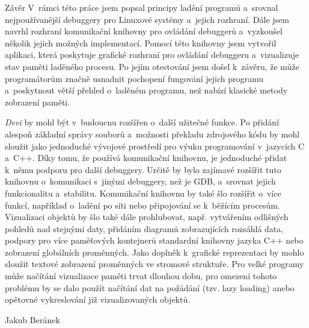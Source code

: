 \documentclass[czech,bachelor,male,python,dept460,hidelinks]{diploma}						%
\newcommand{\parspace}[1][]{
	\ifthenelse{\isempty{#1}}{\vspace{0mm}}{\vspace{#1}}
	\par
}
\begin{document}
\begin{section}{Závěr}
\label{sec:Conclusion}
	V~rámci této práce jsem popsal principy ladění programů a~srovnal nejpoužívanější debuggery pro Linuxové systémy a~jejich rozhraní. Dále jsem
	navrhl rozhraní komunikační knihovny pro ovládání debuggerů a~vyzkoušel několik jejich možných implementací. Pomocí této knihovny jsem
	vytvořil aplikaci, která poskytuje grafické rozhraní pro ovládání debuggeru a~vizualizuje stav paměti laděného procesu. Po jejím otestování jsem
	došel k~závěru, že může programátorům značně usnadnit pochopení fungování jejich programu a~poskytnout větší přehled o~laděném programu, než
	nabízí klasické metody zobrazení paměti.

	\parspace \textit{Devi} by mohl být v~budoucnu rozšířen o~další užitečné funkce. Po přidání alespoň základní správy souborů a~možnosti překladu
	zdrojového kódu by mohl sloužit jako jednoduché vývojové prostředí pro výuku programování v~jazycích C a~C++.
	Díky tomu, že používá komunikační knihovnu, je jednoduché přidat k~němu podporu pro další debuggery. Určitě by bylo
	zajímavé rozšířit tuto knihovnu o~komunikaci s~jinými debuggery, než je GDB, a~srovnat jejich funkcionalitu a~stabilitu.
	Komunikační knihovnu by také šlo rozšířit o~více funkcí, například o~ladění po síti nebo připojování se k~běžícím procesům.
	Vizualizaci objektů by šlo také dále prohlubovat, např. vytvářením odlišných pohledů nad stejnými daty, přidáním diagramů zobrazujících rozsáhlá data,
	podpory pro více paměťových kontejnerů standardní knihovny jazyka C++ nebo zobrazení globálních proměnných.
	Jako doplněk k~grafické reprezentaci by mohlo sloužit textové zobrazení proměnných ve stromové struktuře.
	Pro velké programy může načítání vizualizace paměti trvat dlouhou dobu, pro omezení tohoto problému by se dalo použít načítání dat na požádání
	(tzv. lazy loading) anebo opětovné vykreslování již vizualizovaných objektů.
\end{section}

\bigskip
\begin{flushright}
Jakub Beránek
\end{flushright}

\printbibheading[title=Literatura, heading=bibintoc]
\printbibliography[heading=none]
\end{document}
